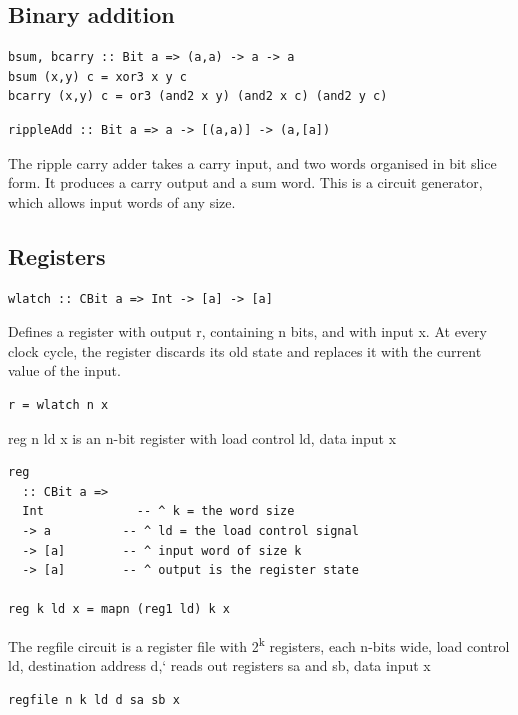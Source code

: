 \documentclass[]{svmono}
\begin{document}
\subsection*{Binary addition}
\label{sec:org4fab090}


\begin{verbatim}
bsum, bcarry :: Bit a => (a,a) -> a -> a
bsum (x,y) c = xor3 x y c
bcarry (x,y) c = or3 (and2 x y) (and2 x c) (and2 y c)
\end{verbatim}



\begin{verbatim}
rippleAdd :: Bit a => a -> [(a,a)] -> (a,[a])
\end{verbatim}


The ripple carry adder takes a carry input, and two words organised in
bit slice form.  It produces a carry output and a sum word.  This is a
circuit generator, which allows input words of any size.
\subsection*{Registers}
\label{sec:org3ee542f}


\begin{verbatim}
wlatch :: CBit a => Int -> [a] -> [a]
\end{verbatim}


Defines a register with output r, containing n bits, and with input x.
At every clock cycle, the register discards its old state and replaces
it with the current value of the input.


\begin{verbatim}
r = wlatch n x
\end{verbatim}

reg n ld x is an n-bit register with load control ld, data input x

\begin{verbatim}
reg
  :: CBit a =>
  Int             -- ^ k = the word size
  -> a          -- ^ ld = the load control signal
  -> [a]        -- ^ input word of size k
  -> [a]        -- ^ output is the register state

reg k ld x = mapn (reg1 ld) k x
\end{verbatim}

The regfile circuit is a register file with 2\textsuperscript{k} registers, each n-bits
wide, load control ld, destination address d,` reads out registers sa
and sb, data input x

\begin{verbatim}
regfile n k ld d sa sb x 
\end{verbatim}
\end{document}
